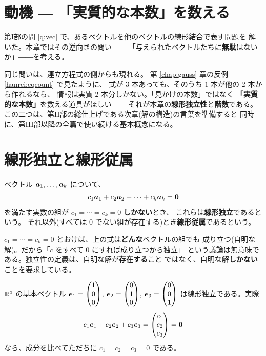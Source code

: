 \section{動機 ― 「実質的な本数」を数える}

第I部の問 \ref{q:vec} で、あるベクトルを他のベクトルの線形結合で表す問題を
解いた。本章ではその逆向きの問い
――「与えられたベクトルたちに\textbf{無駄}はないか」――を考える。

同じ問いは、連立方程式の側からも現れる。
第 \ref{chap:gauss} 章の反例 \ref{hanrei:eqcount} で見たように、
式が $3$ 本あっても、そのうち $1$ 本が他の $2$ 本から作れるなら、
情報は実質 $2$ 本分しかない。「見かけの本数」ではなく
\textbf{「実質的な本数」}を数える道具がほしい
――それが本章の\textbf{線形独立性}と\textbf{階数}である。
この二つは、第II部の総仕上げである次章(解の構造)の言葉を準備すると
同時に、第III部以降の全篇で使い続ける基本概念になる。

\section{線形独立と線形従属}

\begin{teigi}\label{def:linindep}
ベクトル $\bm{a}_1, \dots, \bm{a}_k$ について、
\[
c_1 \bm{a}_1 + c_2 \bm{a}_2 + \cdots + c_k \bm{a}_k = \bm{0}
\]
を満たす実数の組が $c_1 = \cdots = c_k = 0$ \textbf{しかない}とき、
これらは\textbf{線形独立}であるという。
それ以外(すべては $0$ でない組が存在する)とき\textbf{線形従属}であるという。
\end{teigi}

\begin{chui}
$c_1 = \cdots = c_k = 0$ とおけば、上の式は\textbf{どんな}ベクトルの組でも
成り立つ(自明な解)。だから「$c$ をすべて $0$ にすれば成り立つから独立」
という議論は無意味である。独立性の定義は、自明な解が\textbf{存在する}こと
ではなく、自明な解\textbf{しかない}ことを要求している。
\end{chui}

\begin{rei}[基本ベクトルは線形独立]\label{rei:indep-std}
$\mathbb{R}^3$ の基本ベクトル
$\bm{e}_1 = \begin{pmatrix}1 \\ 0 \\ 0\end{pmatrix}$, $\bm{e}_2 = \begin{pmatrix}0 \\ 1 \\ 0\end{pmatrix}$,
$\bm{e}_3 = \begin{pmatrix}0 \\ 0 \\ 1\end{pmatrix}$ は線形独立である。実際
\[
c_1 \bm{e}_1 + c_2 \bm{e}_2 + c_3 \bm{e}_3 = \begin{pmatrix}c_1 \\ c_2 \\ c_3\end{pmatrix}
= \bm{0}
\]
なら、成分を比べてただちに $c_1 = c_2 = c_3 = 0$ である。
\end{rei}

